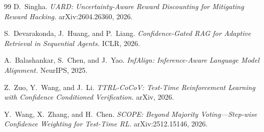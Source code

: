 \documentclass[11pt]{article}
\begin{document}
\begin{thebibliography}{99}
 D.~Singha.
\newblock \textit{UARD: Uncertainty-Aware Reward Discounting for Mitigating Reward Hacking.} arXiv:2604.26360, 2026.

 S.~Devarakonda, J.~Huang, and P.~Liang.
\newblock \textit{Confidence-Gated RAG for Adaptive Retrieval in Sequential Agents.} ICLR, 2026.

 A.~Balashankar, S.~Chen, and J.~Yao.
\newblock \textit{InfAlign: Inference-Aware Language Model Alignment.} NeurIPS, 2025.

 Z.~Zuo, Y.~Wang, and J.~Li.
\newblock \textit{TTRL-CoCoV: Test-Time Reinforcement Learning with Confidence Conditioned Verification.} arXiv, 2026.

 Y.~Wang, X.~Zhang, and H.~Chen.
\newblock \textit{SCOPE: Beyond Majority Voting---Step-wise Confidence Weighting for Test-Time RL.} arXiv:2512.15146, 2026.

\end{thebibliography}
\end{document}
